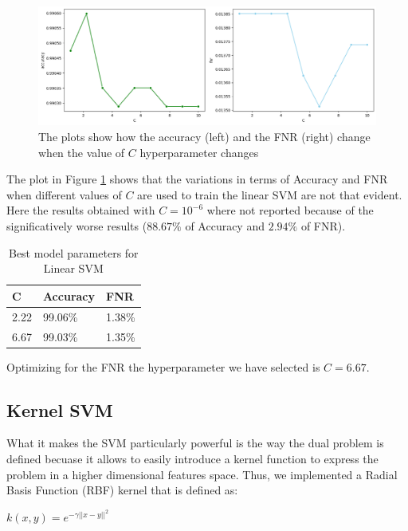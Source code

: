\documentclass[twocolumn, switch]{article} %
\newcommand\x{0.7}
\begin{document}
\begin{figure}[ht!]
	\centering
	\includegraphics[width=\x\linewidth]{linear_svm_accuracy_fnr.png}
	\caption{The plots show how the accuracy (left) and the FNR (right) change when the value of $C$ hyperparameter changes}
	\label{fig:linearsvm}
\end{figure}

The plot in Figure \ref{fig:linearsvm} shows that the variations in terms of Accuracy and FNR when different values of $C$ are used to train the linear SVM are not that evident. Here the results obtained with $C=10^{-6}$ where not reported because of the significatively worse results ($88.67\%$ of Accuracy and $2.94\%$ of FNR). \\

\begin{table}[ht!]
	\centering
	{\small
		\begin{tabular}{|l|l|l|}
			\hline
			\textbf{C} & \textbf{Accuracy} & \textbf{FNR} \\ \hline
			2.22       & 99.06\%           & 1.38\%       \\ \hline
			6.67       & 99.03\%           & 1.35\%       \\ \hline
		\end{tabular}
	}
	\caption{Best model parameters for Linear SVM}
	\vspace{-6mm}
\end{table}

Optimizing for the FNR the hyperparameter we have selected is $C=6.67$.
\subsection{Kernel SVM}
What it makes the SVM particularly powerful is the way the dual problem is defined becuase it allows to easily introduce a kernel function to express the problem in a higher dimensional features space. Thus, we implemented a Radial Basis Function (RBF) kernel that is defined as:
\begin{center}
	$k(x,y) = e^{-\gamma||x-y||^2}$
\end{center}
\end{document}
